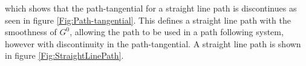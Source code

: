 which shows that the path-tangential for a straight line path is discontinues as seen in figure \ref{Fig:Path-tangential}. This defines a straight line path with the smoothness of $G^0$, allowing the path to be used in a path following system, however with discontinuity in the path-tangential. A straight line path is shown in  figure \ref{Fig:StraightLinePath}.

